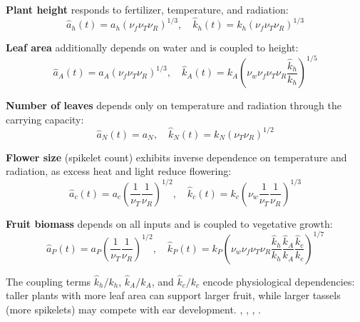 \documentclass[preprint,12pt]{elsarticle}
\newcommand{\df}[2]{\displaystyle\frac{#1}{#2}}
\begin{document}
\textbf{Plant height} responds to fertilizer, temperature, and radiation:
\begin{equation}
\hat{a}_{h}(t) = a_{h}(\nu_{f}\nu_{T}\nu_{R})^{1/3}, \quad \hat{k}_{h}(t) = k_{h}(\nu_{f}\nu_{T}\nu_{R})^{1/3}
\label{eqn:hats-for-h}
\end{equation}

\textbf{Leaf area} additionally depends on water and is coupled to height:
\begin{equation}
\hat{a}_{A}(t) = a_{A}(\nu_{f}\nu_{T}\nu_{R})^{1/3}, \quad \hat{k}_{A}(t) = k_{A}\left(\nu_{w}\nu_{f}\nu_{T}\nu_{R}\df{\hat{k}_{h}}{k_{h}}\right)^{1/5}
\label{eqn:hats-for-A}
\end{equation}

\textbf{Number of leaves} depends only on temperature and radiation through the carrying capacity:
\begin{equation}
\hat{a}_{N}(t) = a_{N}, \quad \hat{k}_{N}(t) = k_{N}(\nu_{T}\nu_{R})^{1/2}
\label{eqn:hats-for-N}
\end{equation}

\textbf{Flower size} (spikelet count) exhibits inverse dependence on temperature and radiation, as excess heat and light reduce flowering:
\begin{equation}
\hat{a}_{c}(t) = a_{c}\left(\df{1}{\nu_{T}}\df{1}{\nu_{R}}\right)^{1/2}, \quad \hat{k}_{c}(t) = k_{c}\left(\nu_{w}\df{1}{\nu_{T}}\df{1}{\nu_{R}}\right)^{1/3}
\label{eqn:hats-for-c}
\end{equation}

\textbf{Fruit biomass} depends on all inputs and is coupled to vegetative growth:
\begin{equation}
\hat{a}_{P}(t) = a_{P}\left(\df{1}{\nu_{T}}\df{1}{\nu_{R}}\right)^{1/2}, \quad \hat{k}_{P}(t) = k_{P}\left(\nu_{w}\nu_{f}\nu_{T}\nu_{R}\df{\hat{k}_{h}}{k_{h}}\df{\hat{k}_{A}}{k_{A}}\df{\hat{k}_{c}}{k_{c}}\right)^{1/7}
\label{eqn:hats-for-P}
\end{equation}

The coupling terms $\hat{k}_{h}/k_{h}$, $\hat{k}_{A}/k_{A}$, and $\hat{k}_{c}/k_{c}$ encode physiological dependencies: taller plants with more leaf area can support larger fruit, while larger tassels (more spikelets) may compete with ear development. \cite{ren2022agronomic_traits_climate_maize_yield}, \cite{stubbs2023plant_height_maize_lodging}, \cite{wang2022maize_tassel_anther_pollen_genetics}, \cite{silveira2024adaptability_maize_tassel_yield}.

\end{document}
